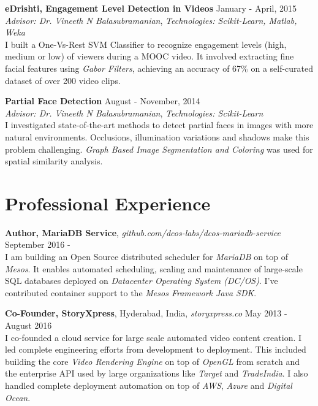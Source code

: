 \documentclass[margin,line]{res}
\begin{document}
\begin{resume}
  \vspace*{-2.5mm}

  {\bf eDrishti, Engagement Level Detection in Videos} \hfill January - April, 2015 \\
  	{\em Advisor: Dr. Vineeth N Balasubramanian}, {\em Technologies: Scikit-Learn, Matlab, Weka} \vspace{0.15 \baselineskip} \\
  	I built a One-Vs-Rest SVM Classifier to recognize engagement levels (high, medium or low) of viewers during a MOOC video. It involved extracting fine facial features using {\it Gabor Filters}, achieving an accuracy of 67\% on a self-curated dataset of over 200 video clips.

  \vspace*{-2.5mm}

  {\bf Partial Face Detection} \hfill August - November, 2014 \\
  	{\em Advisor: Dr. Vineeth N Balasubramanian}, {\em Technologies: Scikit-Learn} \vspace{0.15 \baselineskip} \\
  I investigated state-of-the-art methods to detect partial faces in images with more natural environments. Occlusions, illumination variations and shadows make this problem challenging. {\it Graph Based Image Segmentation and Coloring} was used for spatial similarity analysis.

\section{\sc Professional Experience}

  {\bf Author, MariaDB Service}, {\it github.com/dcos-labs/dcos-mariadb-service} \hfill September 2016 - \\
    I am building an Open Source distributed scheduler for {\it MariaDB} on top of {\em Mesos}. It enables automated scheduling, scaling and maintenance of large-scale SQL databases deployed on {\it Datacenter Operating System (DC/OS)}. I've contributed container support to the {\it Mesos Framework Java SDK}.

  \vspace*{-2.5mm}

  {\bf Co-Founder, StoryXpress}, Hyderabad, India, {\it storyxpress.co}  \hfill May 2013 - August 2016 \\
    I co-founded a cloud service for large scale automated video content creation. I led complete engineering efforts from development to deployment. This included building the core {\it Video Rendering Engine} on top of {\it OpenGL} from scratch and the enterprise API used by large organizations like {\it Target} and {\it TradeIndia}. I also handled complete deployment automation on top of {\it AWS}, {\it Azure} and {\it Digital Ocean}.


\end{resume}
\end{document}
